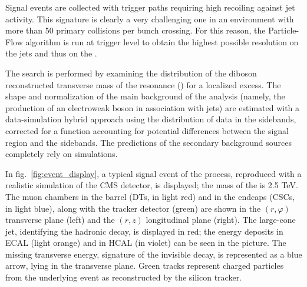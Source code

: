 \noindent Signal events are collected with trigger paths requiring high \met recoiling against jet activity. This signature is clearly a very challenging one in an environment with more than 50 primary collisions per bunch crossing. For this reason, the Particle-Flow algorithm is run at trigger level to obtain the highest possible resolution on the jets and thus on the \met.

\noindent The search is performed by examining the distribution of the diboson reconstructed transverse mass of the resonance \VZ (\mtVZ) for a localized excess. The shape and normalization of the main background of the analysis (namely, the production of an electroweak boson in association with jets) are estimated with a data-simulation hybrid approach using the distribution of data in the sidebands, corrected for a function accounting for potential differences between the signal region and the sidebands. The predictions of the secondary background sources completely rely on simulations.

\noindent In fig.~\ref{fig:event_display}, a typical signal event of the \Wpinv process, reproduced with a realistic simulation of the CMS detector, is displayed; the mass of the \Wp is 2.5 TeV. The muon chambers in the barrel (DTs, in light red) and in the endcaps (CSCs, in light blue), along with the tracker detector (green) are shown in the $(r, \varphi)$ transverse plane (left) and the $(r, z)$ longitudinal plane (right). The large-cone jet, identifying the \W hadronic decay, is displayed in red; the energy deposits in ECAL (light orange) and in HCAL (in violet) can be seen in the picture. The missing transverse energy, signature of the \Z invisible decay, is represented as a blue arrow, lying in the transverse plane. %
Green tracks represent charged particles from the underlying event as reconstructed by the silicon tracker.

